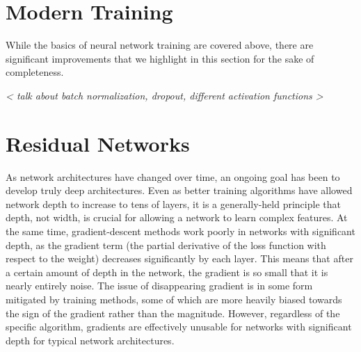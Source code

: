 \section{Modern Training}
While the basics of neural network training are covered above, there are significant improvements that we highlight in this section for the sake of completeness.

\emph{< talk about batch normalization, dropout, different activation functions >}



\section{Residual Networks}
As network architectures have changed over time, an ongoing goal has been to develop truly deep architectures.
Even as better training algorithms have allowed network depth to increase to tens of layers, it is a generally-held principle that depth, not width, is crucial for allowing a network to learn complex features.
At the same time, gradient-descent methods work poorly in networks with significant depth, as the gradient term (the partial derivative of the loss function with respect to the weight) decreases significantly by each layer.
This means that after a certain amount of depth in the network, the gradient is so small that it is nearly entirely noise.
The issue of disappearing gradient is in some form mitigated by training methods, some of which are more heavily biased towards the sign of the gradient rather than the magnitude.
However, regardless of the specific algorithm, gradients are effectively unusable for networks with significant depth for typical network architectures.

